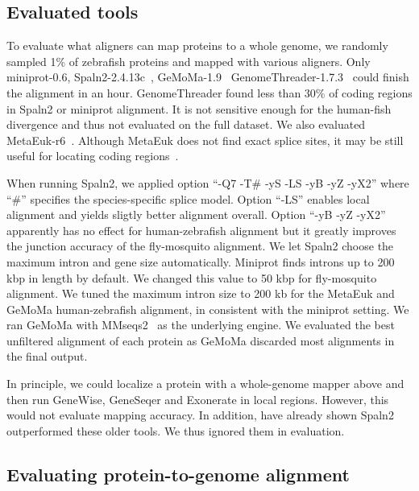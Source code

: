 \documentclass{bioinfo}
\begin{document}
\subsection{Evaluated tools}

To evaluate what aligners can map proteins to a whole genome, we randomly
sampled 1\% of zebrafish proteins and mapped with various aligners. Only
miniprot-0.6, Spaln2-2.4.13c~\citep{Iwata:2012aa}, GeMoMa-1.9~\citep{Keilwagen:2019wz}
GenomeThreader-1.7.3~\citep{DBLP:journals/infsof/GremmeBSK05} could finish the
alignment in an hour.  GenomeThreader found less than 30\% of coding regions in
Spaln2 or miniprot alignment. It is not sensitive enough for the human-fish
divergence and thus not evaluated on the full dataset. We also evaluated
MetaEuk-r6~\citep{Levy-Karin:2020to}. Although MetaEuk does not find exact
splice sites, it may be still useful for locating coding
regions~\citep{Manni:2021ww}.

When running Spaln2, we applied option ``-Q7 -T\# -yS -LS -yB -yZ -yX2'' where
``\#'' specifies the species-specific splice model. Option ``-LS'' enables
local alignment and yields sligtly better alignment overall. Option ``-yB -yZ
-yX2'' apparently has no effect for human-zebrafish alignment but it greatly
improves the junction accuracy of the fly-mosquito alignment. We let Spaln2
choose the maximum intron and gene size automatically. Miniprot finds introns
up to 200 kbp in length by default. We changed this value to 50 kbp for
fly-mosquito alignment. We tuned the maximum intron size to 200 kb for the
MetaEuk and GeMoMa human-zebrafish alignment, in consistent with the miniprot
setting. We ran GeMoMa with MMseqs2~\citep{Steinegger:2017aa} as the underlying
engine. We evaluated the best unfiltered alignment of each protein as GeMoMa
discarded most alignments in the final output.

In principle, we could localize a protein with a whole-genome mapper above and
then run GeneWise, GeneSeqer and Exonerate in local regions. However, this
would not evaluate mapping accuracy. In addition, \citet{Iwata:2012aa} have
already shown Spaln2 outperformed these older tools. We thus ignored them in
evaluation.

\subsection{Evaluating protein-to-genome alignment}
\end{document}

